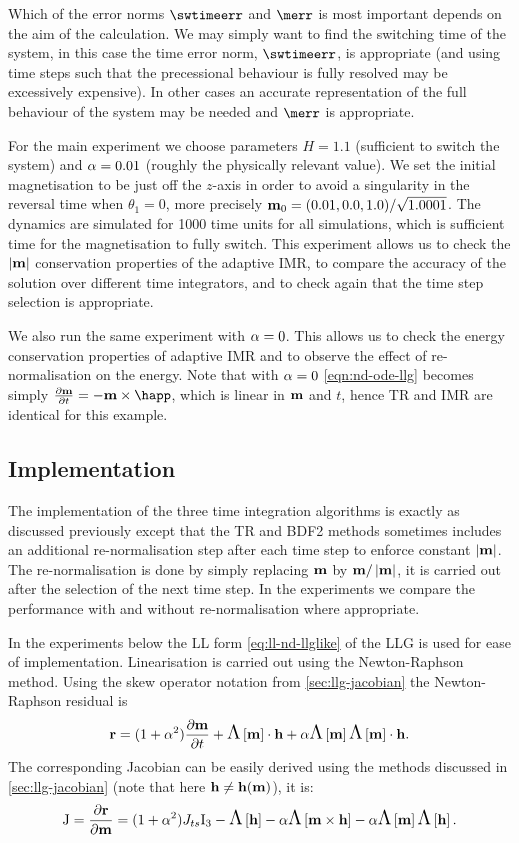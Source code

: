 Which of the error norms $\swtimeerr$ and $\merr$ is most important depends on the aim of the calculation.
We may simply want to find the switching time of the system, in this case the time error norm, $\swtimeerr$, is appropriate (and using time steps such that the precessional behaviour is fully resolved may be excessively expensive).
In other cases an accurate representation of the full behaviour of the system may be needed and $\merr$ is appropriate.

For the main experiment we choose parameters $H = 1.1$ (sufficient to switch the system) and $\alpha = 0.01$ (roughly the physically relevant value).
We set the initial magnetisation to be just off the $z$-axis in order to avoid a singularity in the reversal time when $\theta_1 = 0$, more precisely $\boldsymbol{\mathrm{m}}_0 = (0.01, 0.0, 1.0)/\sqrt{1.0001}$.
The dynamics are simulated for 1000 time units for all simulations, which is sufficient time for the magnetisation to fully switch.
This experiment allows us to check the $\left|{\boldsymbol{\mathrm{m}}} \right|$ conservation properties of the adaptive IMR, to compare the accuracy of the solution over different time integrators, and to check again that the time step selection is appropriate.

We also run the same experiment with $\alpha = 0$.
This allows us to check the energy conservation properties of adaptive IMR and to observe the effect of re-normalisation on the energy.
Note that with $\alpha = 0$ \cref{eqn:nd-ode-llg} becomes simply $\dmdt = - \mv \times \happ$, which is linear in $\boldsymbol{\mathrm{m}}$ and $t$, hence TR and IMR are identical for this example.


\subsection{Implementation}

The implementation of the three time integration algorithms is exactly as discussed previously except that the TR and BDF2 methods sometimes includes an additional re-normalisation step after each time step to enforce constant $\left|{\boldsymbol{\mathrm{m}}} \right|$.
The re-normalisation is done by simply replacing $\boldsymbol{\mathrm{m}}$ by $\boldsymbol{\mathrm{m}}/\left|{\boldsymbol{\mathrm{m}}} \right|$, it is carried out after the selection of the next time step.
In the experiments we compare the performance with and without re-normalisation where appropriate.

In the experiments below the LL form \cref{eq:ll-nd-llglike} of the LLG is used for ease of implementation.
Linearisation is carried out using the Newton-Raphson method.
Using the skew operator notation from \cref{sec:llg-jacobian} the Newton-Raphson residual is
\begin{equation}
  \boldsymbol{\mathrm{r}} = (1 + \alpha^2) \frac{\partial \boldsymbol{\mathrm{m}}}{\partial t} + \text{\Large{$\Lambda$}}\left[ \boldsymbol{\mathrm{m}} \right] \cdot \boldsymbol{\mathrm{h}} + \alpha \text{\Large{$\Lambda$}}\left[ \boldsymbol{\mathrm{m}} \right]\text{\Large{$\Lambda$}}\left[ \boldsymbol{\mathrm{m}} \right] \cdot \boldsymbol{\mathrm{h}}.
\end{equation}
The corresponding Jacobian can be easily derived using the methods discussed in \cref{sec:llg-jacobian} (note that here $\boldsymbol{\mathrm{h}} \neq \boldsymbol{\mathrm{h}}(\boldsymbol{\mathrm{m}})$), it is:
\begin{equation}
  \mathrm{J} = \frac{\partial \boldsymbol{\mathrm{r}}}{\partial \boldsymbol{\mathrm{m}}} = (1 + \alpha^2) J_{ts} \mathrm{I}_3 - \text{\Large{$\Lambda$}}\left[ \boldsymbol{\mathrm{h}} \right] - \alpha \text{\Large{$\Lambda$}}\left[  \boldsymbol{\mathrm{m}} \times \boldsymbol{\mathrm{h}}  \right]
  - \alpha \text{\Large{$\Lambda$}}\left[ \boldsymbol{\mathrm{m}} \right] \text{\Large{$\Lambda$}}\left[ \boldsymbol{\mathrm{h}} \right].
\end{equation}

